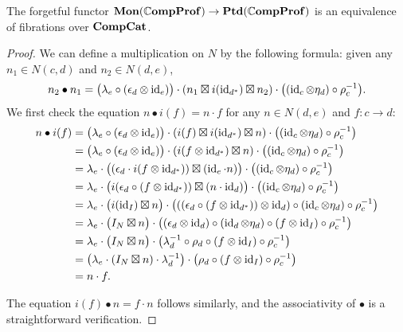 \documentclass[12pt,oneside,article,draft]{memoir}
\begin{document}
\begin{proposition}\label{prop:unit_implies_monoid}
   The forgetful functor $\mathbf{Mon}(\mathbb{C}\mathbf{ompProf})\to\mathbf{Ptd}(\mathbb{C}\mathbf{ompProf})$ is an equivalence of fibrations over $\mathbf{CompCat}$.
\end{proposition}
\begin{proof}
   We can define a multiplication on $N$ by the following formula: given any $n_1\in N(c,d)$ and $n_2\in N(d,e)$,
   \[
      n_2\bullet n_1 = \bigl(\lambda_e\circ(\epsilon_d\otimes\operatorname{id}_e)\bigr)\cdot(n_1\boxtimes i(\operatorname{id}_{d^*})\boxtimes n_2)\cdot\bigl((\operatorname{id}_c\otimes \eta_d)\circ\rho_c^{-1}\bigr).
   \]
   We first check the equation $n\bullet i(f)=n\cdot f$ for any $n\in N(d,e)$ and $f\colon c\to d$:
   \begin{align*}
      n\bullet i(f) &= \bigl(\lambda_e\circ(\epsilon_d\otimes\operatorname{id}_e)\bigr)\cdot(i(f)\boxtimes i(\operatorname{id}_{d^*})\boxtimes n)\cdot\bigl((\operatorname{id}_c\otimes \eta_d)\circ\rho_c^{-1}\bigr) \\
      &= \bigl(\lambda_e\circ(\epsilon_d\otimes\operatorname{id}_e)\bigr)\cdot(i(f\otimes\operatorname{id}_{d^*})\boxtimes n)\cdot\bigl((\operatorname{id}_c\otimes \eta_d)\circ\rho_c^{-1}\bigr) \\
      &= \lambda_e\cdot\bigl((\epsilon_d\cdot i(f\otimes \operatorname{id}_{d^*}))\boxtimes (\operatorname{id}_e\cdot n)\bigr)\cdot\bigl((\operatorname{id}_c\otimes \eta_d)\circ\rho_c^{-1}\bigr) \\
      &= \lambda_e\cdot\bigl(i(\epsilon_d\circ (f\otimes \operatorname{id}_{d^*}))\boxtimes (n\cdot\operatorname{id}_d)\bigr)\cdot\bigl((\operatorname{id}_c\otimes \eta_d)\circ\rho_c^{-1}\bigr) \\
      &= \lambda_e\cdot\bigl(i(\operatorname{id}_I)\boxtimes n\bigr)\cdot\bigl(((\epsilon_d\circ (f\otimes \operatorname{id}_{d^*}))\otimes\operatorname{id}_d)\circ(\operatorname{id}_c\otimes \eta_d)\circ\rho_c^{-1}\bigr) \\
      &= \lambda_e\cdot\bigl(I_N\boxtimes n\bigr)\cdot\bigl((\epsilon_d\otimes\operatorname{id}_d)\circ(\operatorname{id}_d\otimes\eta_d)\circ(f\otimes\operatorname{id}_I)\circ\rho_c^{-1}\bigr) \\
      &= \lambda_e\cdot\bigl(I_N\boxtimes n\bigr)\cdot\bigl(\lambda_d^{-1}\circ\rho_d\circ(f\otimes\operatorname{id}_I)\circ\rho_c^{-1}\bigr) \\
      &= \bigl(\lambda_e\cdot(I_N\boxtimes n)\cdot\lambda_d^{-1}\bigr)\cdot\bigl(\rho_d\circ(f\otimes\operatorname{id}_I)\circ\rho_c^{-1}\bigr) \\
      &= n\cdot f.
   \end{align*}

   The equation $i(f)\bullet n=f\cdot n$ follows similarly, and the associativity of $\bullet$ is a straightforward verification.


\end{proof}
\end{document}
